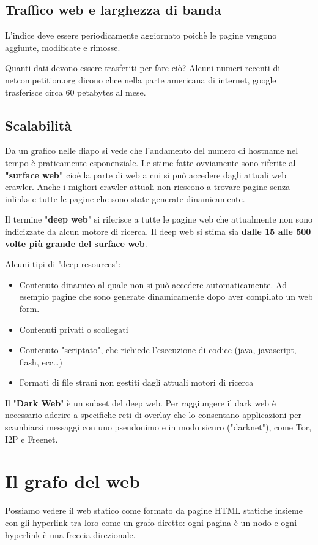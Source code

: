 \subsection{Traffico web e larghezza di banda}
L'indice deve essere periodicamente aggiornato poichè le pagine vengono aggiunte, modificate e rimosse. 

Quanti dati devono essere trasferiti per fare ciò? Alcuni numeri recenti di netcompetition.org dicono chce nella parte americana di internet, google trasferisce circa 60 petabytes al mese. 

\subsection{Scalabilità}
Da un grafico nelle diapo si vede che l'andamento del numero di hostname nel tempo è praticamente esponenziale. Le stime fatte ovviamente sono riferite al \textbf{"surface web"} cioè la parte di web a cui si può accedere dagli attuali web crawler. Anche i migliori crawler attuali non riescono a trovare pagine senza inlinks e tutte le pagine che sono state generate dinamicamente. 

Il termine "\textbf{deep web}" si riferisce a tutte le pagine web che attualmente non sono indicizzate da alcun motore di ricerca. Il deep web si stima sia \textbf{dalle 15 alle 500 volte più grande del surface web}. 

Alcuni tipi di "deep resources":
\begin{itemize}
    \item Contenuto dinamico al quale non si può accedere automaticamente. Ad esempio pagine che sono generate dinamicamente dopo aver compilato un web form.
    \item Contenuti privati o scollegati
    \item Contenuto "scriptato", che richiede l'esecuzione di codice (java, javascript, flash, ecc\dots)
    \item Formati di file strani non gestiti dagli attuali motori di ricerca
\end{itemize}
Il "\textbf{Dark Web}" è un subset del deep web. Per raggiungere il dark web è necessario aderire a specifiche reti di overlay che lo consentano
applicazioni per scambiarsi messaggi con uno pseudonimo e
in modo sicuro ("darknet"), come Tor, I2P e Freenet.


\section{Il grafo del web}
Possiamo vedere il web statico come formato da pagine HTML statiche insieme con gli hyperlink tra loro come un grafo diretto: ogni pagina è un nodo e ogni hyperlink è una freccia direzionale. 

